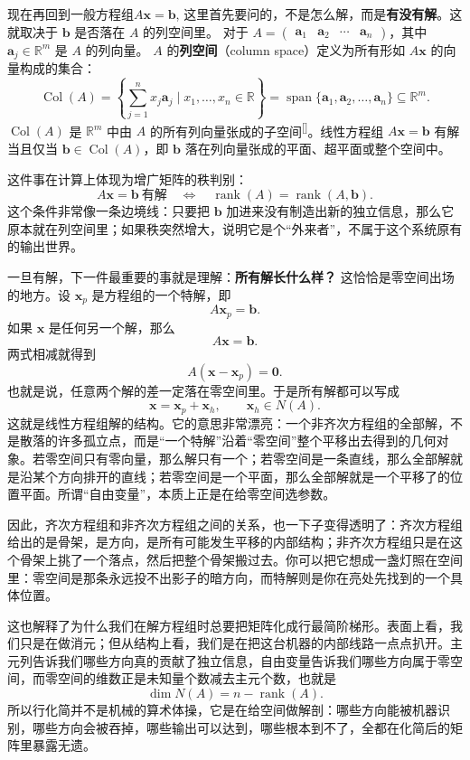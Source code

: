 \documentclass[UTF8]{ctexbook}
\begin{document}
现在再回到一般方程组$A\mathbf{x}=\mathbf{b}$,
这里首先要问的，不是怎么解，而是\textbf{有没有解}。这就取决于 $\mathbf{b}$ 是否落在 $A$ 的列空间里。
对于 $A = \begin{pmatrix} \mathbf{a}_1 & \mathbf{a}_2 & \cdots & \mathbf{a}_n \end{pmatrix}$，其中 $\mathbf{a}_j \in \mathbb{R}^m$ 是 $A$ 的列向量。
$A$ 的\textbf{列空间}\label{cspace}（column space）定义为所有形如 $A\mathbf{x}$ 的向量构成的集合：
\[
\operatorname{Col}(A) = \left\{ \sum_{j=1}^{n} x_j \mathbf{a}_j \;\big|\; x_1,\ldots,x_n \in \mathbb{R} \right\} = \operatorname{span}\{\mathbf{a}_1, \mathbf{a}_2, \ldots, \mathbf{a}_n\} \subseteq \mathbb{R}^m.
\]
$\operatorname{Col}(A)$ 是 $\mathbb{R}^m$ 中由 $A$ 的所有列向量张成的子空间\textsuperscript{[\pageref{space}]}。线性方程组 $A\mathbf{x} = \mathbf{b}$ 有解当且仅当 $\mathbf{b} \in \operatorname{Col}(A)$，即 $\mathbf{b}$ 落在列向量张成的平面、超平面或整个空间中。


这件事在计算上体现为增广矩阵的秩判别：
\[
A\mathbf{x}=\mathbf{b}\ \text{有解}
\quad\Longleftrightarrow\quad
\operatorname{rank}(A)=\operatorname{rank}(A,\mathbf{b}).
\]
这个条件非常像一条边境线：只要把 $\mathbf{b}$ 加进来没有制造出新的独立信息，那么它原本就在列空间里；如果秩突然增大，说明它是个“外来者”，不属于这个系统原有的输出世界。

一旦有解，下一件最重要的事就是理解：\textbf{所有解长什么样？} 这恰恰是零空间出场的地方。设 $\mathbf{x}_p$ 是方程组的一个特解，即
\[
A\mathbf{x}_p=\mathbf{b}.
\]
如果 $\mathbf{x}$ 是任何另一个解，那么
\[
A\mathbf{x}=\mathbf{b}.
\]
两式相减就得到
\[
A(\mathbf{x}-\mathbf{x}_p)=\mathbf{0}.
\]
也就是说，任意两个解的差一定落在零空间里。于是所有解都可以写成
\[
\mathbf{x}=\mathbf{x}_p+\mathbf{x}_h,
\qquad \mathbf{x}_h\in N(A).
\]
这就是线性方程组解的结构。它的意思非常漂亮：一个非齐次方程组的全部解，不是散落的许多孤立点，而是“一个特解”沿着“零空间”整个平移出去得到的几何对象。若零空间只有零向量，那么解只有一个；若零空间是一条直线，那么全部解就是沿某个方向排开的直线；若零空间是一个平面，那么全部解就是一个平移了的位置平面。所谓“自由变量”，本质上正是在给零空间选参数。

因此，齐次方程组和非齐次方程组之间的关系，也一下子变得透明了：齐次方程组给出的是骨架，是方向，是所有可能发生平移的内部结构；非齐次方程组只是在这个骨架上挑了一个落点，然后把整个骨架搬过去。你可以把它想成一盏灯照在空间里：零空间是那条永远投不出影子的暗方向，而特解则是你在亮处先找到的一个具体位置。

这也解释了为什么我们在解方程组时总要把矩阵化成行最简阶梯形。表面上看，我们只是在做消元；但从结构上看，我们是在把这台机器的内部线路一点点扒开。主元列告诉我们哪些方向真的贡献了独立信息，自由变量告诉我们哪些方向属于零空间，而零空间的维数正是未知量个数减去主元个数，也就是
\[
\dim N(A)=n-\operatorname{rank}(A).
\]
所以行化简并不是机械的算术体操，它是在给空间做解剖：哪些方向能被机器识别，哪些方向会被吞掉，哪些输出可以达到，哪些根本到不了，全都在化简后的矩阵里暴露无遗。
\end{document}
